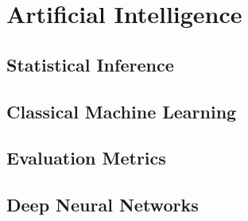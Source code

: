 \section{Artificial Intelligence} \label{sec:bt_ArtificialIntelligence}

\subsection{Statistical Inference}
\subsection{Classical Machine Learning}
\subsection{Evaluation Metrics}
\subsection{Deep Neural Networks}